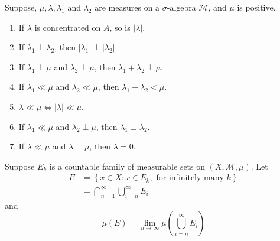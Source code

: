 \documentclass[12pt, a4paper, oneside]{book}
\begin{document}
\begin{proposition}
    Suppose, $\mu, \lambda, \lambda_1$ and $\lambda_2$ are measures on a $\sigma$-algebra $\mathcal{M}$, and $\mu$ is positive.
    \begin{enumerate}
        \item
              If $\lambda$ is concentrated on $A$, so is $|\lambda|$.

        \item
              If $\lambda_1 \perp \lambda_2$, then $\left|\lambda_1\right| \perp\left|\lambda_2\right|$.

        \item
              If $\lambda_1 \perp \mu$ and $\lambda_2 \perp \mu$, then $\lambda_1+\lambda_2 \perp \mu$.

        \item
              If $\lambda_1 \ll \mu$ and $\lambda_2 \ll \mu$, then $\lambda_1+\lambda_2<\mu$.

        \item
              $\lambda \ll \mu \Leftrightarrow \left|\lambda\right| \ll \mu $.

        \item
              If $\lambda_1 \ll \mu$ and $\lambda_2 \perp \mu$, then $\lambda_1 \perp \lambda_2$.

        \item
              If $\lambda \ll \mu$ and $\lambda \perp \mu$, then $\lambda=0$.
    \end{enumerate}
\end{proposition}

\begin{lemma}
    Suppose $E_k$ is a countable family of measurable sets on $(X, \mathcal{M}, \mu)$. Let
    \begin{equation*}
        \begin{aligned}
            E & =\left\{x\in X: x\in E_k, \text{ for infinitely many } k\right\} \\
              & =\bigcap_{n=1}^{\infty} \bigcup_{i=n}^{\infty} E_i
        \end{aligned}
    \end{equation*}
    and
    \begin{equation*}
        \mu(E)= \lim_{n\to \infty} \mu(\bigcup_{i=n}^{\infty} E_i)
    \end{equation*}
\end{lemma}
\end{document}
